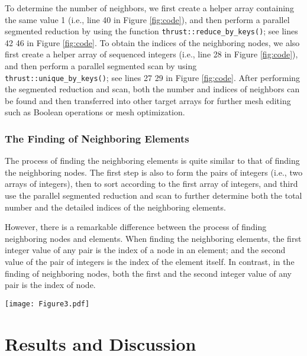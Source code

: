 \documentclass[twocolumn]{svjour3}          \smartqed  \usepackage{graphicx}
\begin{document}
To determine the number of neighbors, we first create a helper array 
containing the same value 1 (i.e., line 40 in Figure \ref{fig:code}), and then perform a 
parallel segmented reduction by using the function 
\texttt{thrust::reduce{\_}by{\_}keys()}; see lines 42  46 in Figure \ref{fig:code}. To obtain the indices of the neighboring nodes, we also first create a 
helper array of sequenced integers (i.e., line 28 in Figure \ref{fig:code}), and then 
perform a parallel segmented scan by using  
\texttt{thrust::unique{\_}by{\_}keys()}; see lines 27  29 in Figure \ref{fig:code}. After performing the segmented reduction and scan, both the number and 
indices of neighbors can be found and then transferred into other target 
arrays for further mesh editing such as Boolean operations or mesh 
optimization. 

\subsubsection{The Finding of Neighboring Elements}

The process of finding the neighboring elements is quite similar to that of 
finding the neighboring nodes. The first step is also to form the pairs of 
integers (i.e., two arrays of integers), then to sort according to the first 
array of integers, and third use the parallel segmented reduction and scan 
to further determine both the total number and the detailed indices of the 
neighboring elements. 

However, there is a remarkable difference between the process of finding 
neighboring nodes and elements. When finding the neighboring elements, the 
first integer value of any pair is the index of a node in an element; and 
the second value of the pair of integers is the index of the element itself. 
In contrast, in the finding of neighboring nodes, both the first and the 
second integer value of any pair is the index of node. 

\begin{figure*}[htbp]
	\centering
    \texttt{[image: Figure3.pdf]}
	\caption{Partial GPU implementation for finding neighboring nodes}
	\label{fig:code}       \end{figure*}




\section{Results and Discussion}
\end{document}
